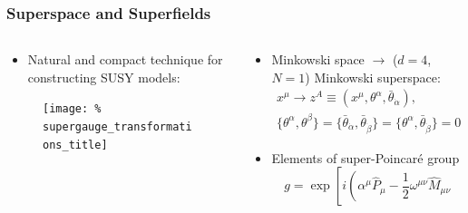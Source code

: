 \documentclass[10pt,aspectratio=169]{beamer}
\begin{document}
\begin{frame}
  \frametitle{Superspace and Superfields}
  \begin{columns}[t]
    \begin{column}{0.5\textwidth}
      \begin{itemize}\itemsep1em
      \item {\color{blue} Natural and compact} technique for constructing
        SUSY models:
      \end{itemize}
      \vspace*{5pt}
      \begin{figure}
        \centering
        \texttt{[image: \%
          supergauge\_transformations\_title]}
      \end{figure}
      \vspace*{-2pt}
    \end{column}
    \begin{column}{0.5\textwidth}
      \begin{itemize}\itemsep1em
      \item Minkowski space $\to$ ($d = 4$, $N = 1$) Minkowski superspace:
        \begin{gather*}
          x^\mu \to z^A \equiv
          (x^\mu, \theta^\alpha, \bar{\theta}_{\dot{\alpha}} ), \\
          \{ \theta^\alpha, \theta^\beta \} =
          \{ \bar{\theta}_{\dot{\alpha}}, \bar{\theta}_{\dot{\beta}} \} =
          \{ \theta^\alpha , \bar{\theta}_{\dot{\beta}} \} = 0
        \end{gather*}
      \item Elements of super-Poincar\'{e} group
        \begin{equation*}
          g = \exp \left [ i \left ( \alpha^\mu \hat{P}_\mu
            - \frac{1}{2} \omega^{\mu \nu} \hat{M}_{\mu \nu}

\end{equation*}
\end{itemize}
\end{column}
\end{columns}
\end{frame}
\end{document}
